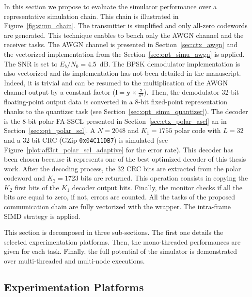 In this section we propose to evaluate the simulator performance over a
representative simulation chain. This chain is illustrated in
Figure~\ref{fig:simu_chain}. The transmitter is simplified and only all-zero
codewords are generated. This technique enables to bench only the AWGN channel
and the receiver tasks. The AWGN channel is presented in
Section~\ref{sec:ctx_awgn} and the vectorized implementation from the
Section~\ref{sec:opt_simu_awgn} is applied. The SNR is set to
$E_b/N_0 = 4.5$~dB. The BPSK demodulator implementation is also vectorized and
its implementation has not been detailed in the manuscript. Indeed, it is
trivial and can be resumed to the multiplication of the AWGN channel output by a
constant factor ($\bm{l} = \bm{y} \times \frac{2}{\sigma^2}$). Then, the
demodulator 32-bit floating-point output data is converted in a 8-bit
fixed-point representation thanks to the quantizer task (see
Section~\ref{sec:opt_simu_quantizer}). The decoder is the 8-bit polar FA-SSCL
presented in Section~\ref{sec:ctx_polar_ascl} an in
Section~\ref{sec:opt_polar_scl}. A $N = 2048$ and $K_1 = 1755$ polar code with
$L = 32$ and a 32-bit CRC (GZip \verb|0x04C11DB7|) is simulated (see
Figure~\ref{plot:aff3ct_polar_scl_adaptive} for the error rate). This decoder
has been chosen because it represents one of the best optimized decoder of this
thesis work. After the decoding process, the 32 CRC bits are extracted from the
polar codeword and $K_2 = 1723$ bits are returned. This operation consists in
copying the $K_2$ first bits of the $K_1$ decoder output bits. Finally, the
monitor checks if all the bits are equal to zero, if not, errors are counted.
All the tasks of the proposed communication chain are fully vectorized with the
\MIPP wrapper. The intra-frame SIMD strategy is applied.

This section is decomposed in three sub-sections. The first one details the
selected experimentation platforms. Then, the mono-threaded performances
are given for each task. Finally, the full potential of the simulator is
demonstrated over multi-threaded and multi-node executions.

\subsection{Experimentation Platforms}

